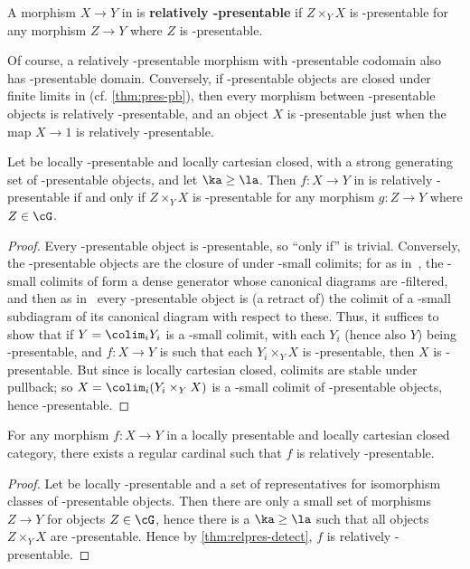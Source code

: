 \begin{defn}
  A morphism $X\to Y$ in \E is \textbf{relatively \ka-presentable} if $Z\times_Y X$ is \ka-presentable for any morphism $Z\to Y$ where $Z$ is \ka-presentable.
\end{defn}

Of course, a relatively \ka-presentable morphism with \ka-presentable codomain also has \ka-presentable domain.
Conversely, if \ka-presentable objects are closed under finite limits in \E (cf. \cref{thm:pres-pb}), then every morphism between \ka-presentable objects is relatively \ka-presentable, and an object $X$ is \ka-presentable just when the map $X\to 1$ is relatively \ka-presentable.

\begin{prop}\label{thm:relpres-detect}
  Let \E be locally \la-presentable and locally cartesian closed, with \cG a strong generating set of \la-presentable objects, and let $\ka\ge\la$.
  Then $f:X\to Y$ in \E is relatively \ka-presentable if and only if $Z\times_Y X$ is \ka-presentable for any morphism $g:Z\to Y$ where $Z\in\cG$.
\end{prop}
\begin{proof}
  Every \la-presentable object is \ka-presentable, so ``only if'' is trivial.
  Conversely, the \ka-presentable objects are the closure of \cG under \ka-small colimits; for as in~\cite[Theorem 1.11]{ar:loc-pres}, the \la-small colimits of \cG form a dense generator whose canonical diagrams are \la-filtered, and then as in~\cite[Remark 1.30]{ar:loc-pres} every \ka-presentable object is (a retract of) the colimit of a \ka-small subdiagram of its canonical diagram with respect to these.
  Thus, it suffices to show that if $Y = \colim_i Y_i$ is a \ka-small colimit, with each $Y_i$ (hence also $Y$) being \ka-presentable, and $f:X\to Y$ is such that each $Y_i \times_Y X$ is \ka-presentable, then $X$ is \ka-presentable.
  But since \E is locally cartesian closed, colimits are stable under pullback; so $X = \colim_i (Y_i \times_Y X)$ is a \ka-small colimit of \ka-presentable objects, hence \ka-presentable.
\end{proof}

\begin{cor}
  For any morphism $f:X\to Y$ in a locally presentable and locally cartesian closed category, there exists a regular cardinal \ka such that $f$ is relatively \ka-presentable.
\end{cor}
\begin{proof}
  Let \E be locally \la-presentable and \cG a set of representatives for isomorphism classes of \la-presentable objects.
  Then there are only a small set of morphisms $Z\to Y$ for objects $Z\in \cG$, hence there is a $\ka\ge \la$ such that all objects $Z\times_Y X$ are \ka-presentable.
  Hence by \cref{thm:relpres-detect}, $f$ is relatively \ka-presentable.
\end{proof}


